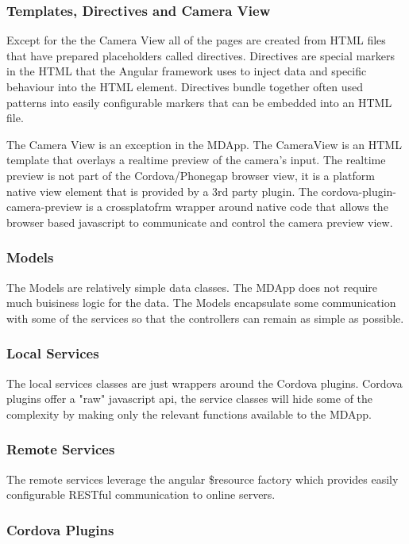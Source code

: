 \subsubsection{Templates, Directives and Camera View}
Except for the the Camera View all of the pages are created from HTML files that have prepared placeholders called directives. Directives are special markers in the HTML that the Angular framework uses to inject data and specific behaviour into the HTML element. Directives bundle together often used patterns into easily configurable markers that can be embedded into an HTML file.

The Camera View is an exception in the MDApp. The CameraView is an HTML template that overlays a realtime preview of the camera’s input. The realtime preview is not part of the Cordova/Phonegap browser view, it is a platform native view element that is provided by a 3rd party plugin. The cordova-plugin-camera-preview is a crossplatofrm wrapper around native code that allows the browser based javascript to communicate and control the camera preview view.

\subsubsection{Models}
The Models are relatively simple data classes. The MDApp does not require much buisiness logic for the data. The Models encapsulate some communication with some of the services so that the controllers can remain as simple as possible.

\subsubsection{Local Services}
The local services classes are just wrappers around the Cordova plugins. Cordova plugins offer a "raw" javascript api, the service classes will hide some of the complexity by making only the relevant functions available to the MDApp.

\subsubsection{Remote Services}
The remote services leverage the angular \$resource factory which provides easily configurable RESTful communication to online servers.

\subsubsection{Cordova Plugins}

